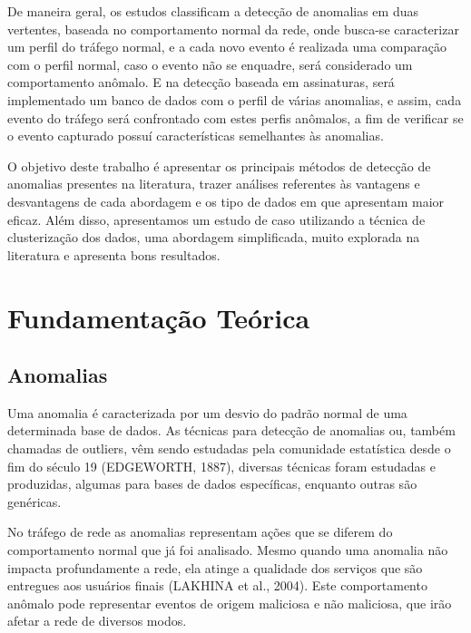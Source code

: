 \documentclass[12pt,openright,oneside,a4paper,english,spanish,brazil]{unifil}
\begin{document}
\indent De maneira geral, os estudos classificam a detecção de anomalias em duas vertentes, baseada no comportamento normal da rede, onde busca-se caracterizar um perfil do tráfego normal, e a cada novo evento é realizada uma comparação com o perfil normal, caso o evento não se enquadre, será considerado um comportamento anômalo. E na detecção baseada em assinaturas, será implementado um banco de dados com o perfil de várias anomalias, e assim, cada evento do tráfego será confrontado com estes perfis anômalos, a fim de verificar se o evento capturado possuí características semelhantes às anomalias. 

\indent O objetivo deste trabalho é apresentar os principais métodos de detecção de anomalias presentes na literatura, trazer análises referentes às vantagens e desvantagens de cada abordagem e os tipo de dados em que apresentam maior eficaz. Além disso, apresentamos um estudo de caso utilizando a técnica de clusterização dos dados, uma abordagem simplificada, muito explorada na literatura e apresenta bons resultados.

\chapter{Fundamentação Teórica}

  \section{Anomalias}

\indent Uma anomalia é caracterizada por um desvio do padrão normal de uma determinada base de dados. As técnicas para detecção de anomalias ou, também chamadas de outliers, vêm sendo estudadas pela comunidade estatística desde o fim do século 19 (EDGEWORTH, 1887), diversas técnicas foram estudadas e produzidas, algumas para bases de dados específicas, enquanto outras são genéricas.

\indent No tráfego de rede as anomalias representam ações que se diferem do comportamento normal que já foi analisado. Mesmo quando uma anomalia não impacta profundamente a rede, ela atinge a qualidade dos serviços que são entregues aos usuários finais (LAKHINA et al., 2004).  Este comportamento anômalo pode representar eventos de origem maliciosa e não maliciosa, que irão afetar a rede de diversos modos. 
\end{document}
